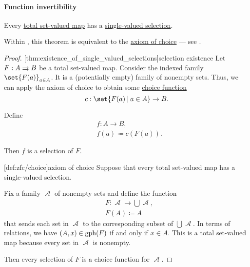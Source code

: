 \paragraph{Function invertibility}

\begin{theorem}\label{thm:existence_of_single_valued_selections}
  Every \hyperref[def:set_valued_map/partial]{total set-valued map} has a \hyperref[def:function/selection]{single-valued selection}.
\end{theorem}
\begin{comments}
  \item Within \hyperref[def:zfc]{}, this theorem is equivalent to the \hyperref[def:zfc/choice]{axiom of choice} --- see .
\end{comments}
\begin{proof}
  [thm:existence_of_single_valued_selections]{selection existence} Let \( F: A \rightrightarrows B \) be a total set-valued map. Consider the indexed family \( \set{ F(a) }_{a \in A} \). It is a (potentially empty) family of nonempty sets. Thus, we can apply the axiom of choice to obtain some \hyperref[def:choice_function]{choice function}
  \begin{equation*}
    c: \set{ F(a) \given a \in A } \to B.
  \end{equation*}

  Define
  \begin{equation*}
    \begin{aligned}
      &f: A \to B, \\
      &f(a) \coloneqq c(F(a)).
    \end{aligned}
  \end{equation*}

  Then \( f \) is a selection of \( F \).

  [def:zfc/choice]{axiom of choice} Suppose that every total set-valued map has a single-valued selection.

  Fix a family \( \mscrA \) of nonempty sets and define the function
  \begin{equation*}
    \begin{aligned}
      &F: \mscrA \to \bigcup \mscrA, \\
      &F(A) \coloneqq A
    \end{aligned}
  \end{equation*}
  that sends each set in \( \mscrA \) to the corresponding subset of \( \bigcup \mscrA \). In terms of relations, we have \( (A, x) \in \operatorname{gph}(F) \) if and only if \( x \in A \). This is a total set-valued map because every set in \( \mscrA \) is nonempty.

  Then every selection of \( F \) is a choice function for \( \mscrA \).
\end{proof}

